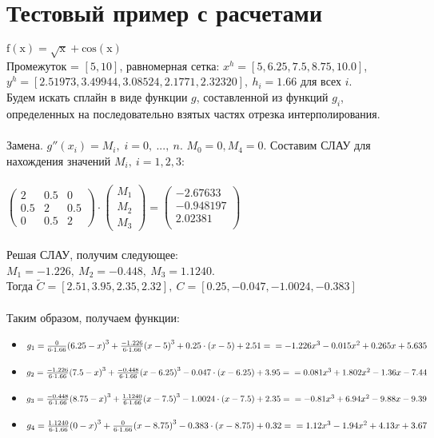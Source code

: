 \documentclass[12pt]{article}
\begin{document}
\section{Тестовый пример с расчетами}
$\mathrm{f(x) = \sqrt{x} + cos (x)} $\\
Промежуток = $[5, 10]$, равномерная сетка: $x^h = [5, 6.25, 7.5, 8.75, 10.0]$, \\ $y^h = [2.51973, 3.49944, 3.08524, 2.1771, 2.32320],\  h_i = 1.66$ для всех $i$.\\
Будем искать сплайн в виде функции $g$, составленной из функций $g_i$, определенных на последовательно взятых частях отрезка интерполирования. \\\\
Замена. $g''(x_i) = M_i,\; i=0,\ ...,\ n$. $M_0 = 0, M_4 = 0$.
Составим СЛАУ для нахождения значений $M_i,\ i=1,2,3$:\\\\
$\begin{pmatrix}
2& 0.5& 0\\
0.5& 2& 0.5\\ 
0& 0.5& 2
\end{pmatrix} \cdot
\begin{pmatrix}
M_1\\
M_2\\ 
M_3
\end{pmatrix} = 
\begin{pmatrix}
-2.67633\\
-0.948197\\
2.02381\\
\end{pmatrix}$\\\\
Решая СЛАУ, получим следующее:\\
$M_1 = -1.226,\ M_2 = -0.448,\ M_3 = 1.1240$.\\
Тогда $\tilde{C} = [2.51, 3.95, 2.35, 2.32],\ 
C = [0.25, -0.047,-1.0024, -0.383]$\\\\
Таким образом, получаем функции:
\begin{itemize}
    \item $g_1 = \frac{0}{6 \cdot 1.66}{(6.25-x)}^3 + \frac{-1.226}{6 \cdot 1.66}{(x - 5)}^3 + 0.25 \cdot (x - 5) +2.51 = \\\\ = -1.226 x^3 -0.015x^2 + 0.265x + 5.635$
    \item $g_2 = \frac{-1.226}{6 \cdot 1.66}{(7.5-x)}^3 + \frac{-0.448}{6 \cdot 1.66}{(x - 6.25)}^3 -0.047\cdot (x - 6.25) + 3.95 = \\\\ = 0.081 x^3 +1.802 x^2 - 1.36x - 7.44$
    \item $g_3 = \frac{-0.448}{6 \cdot 1.66}{(8.75-x)}^3 + \frac{1.1240}{6 \cdot 1.66}{(x - 7.5)}^3 -1.0024 \cdot (x - 7.5) + 2.35 = \\\\ = -0.81 x^3 + 6.94 x^2 - 9.88 x -9.39$
    \item $g_4 = \frac{1.1240}{6 \cdot 1.66}{(0-x)}^3 + \frac{0}{6 \cdot 1.66}{(x - 8.75)}^3 - 0.383 \cdot (x - 8.75) + 0.32 = \\\\ = 1.12 x^3 - 1.94 x^2 + 4.13 x +3.67$
\end{itemize}
\end{document}
